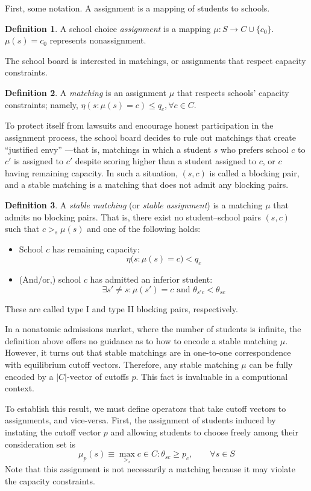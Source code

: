 \documentclass[12pt]{article}
\numberwithin{equation}{subsection}
\theoremstyle{definition}
\newtheorem{definition}{Definition}
\begin{document}
First, some notation. A assignment is a mapping of students to schools.
\begin{definition}
A school choice \emph{assignment} is a mapping $\mu: S \to C \cup \{c_0\}$. $\mu(s) = c_0$ represents nonassignment.
\end{definition}
The school board is interested in matchings, or assignments that respect capacity constraints. 
\begin{definition}
A \emph{matching} is an assignment $\mu$ that respects schools' capacity constraints; namely, $\eta (s: \mu(s) = c) \leq q_c, \forall c \in C$. 
\end{definition}
To protect itself from lawsuits and encourage honest participation in the assignment process, the school board decides to rule out matchings that create ``justified envy'' \parencite[][7]{expandingchoice}---that is, matchings in which a student $s$ who prefers school $c$ to $c'$ is assigned to $c'$ despite scoring higher than a student assigned to $c$, or $c$ having remaining capacity. In such a situation, $(s, c)$ is called a blocking pair, and a stable matching is a matching that does not admit any blocking pairs.
\begin{definition}
A \emph{stable matching} (or \emph{stable assignment}) is a matching $\mu$ that admits no blocking pairs. That is, there exist no student--school pairs $(s, c)$ such that $c >_s \mu(s)$ and one of the following holds:
\begin{itemize}
\item School $c$ has remaining capacity:
\[\eta\bigl(s: \mu(s) = c \bigr) < q_c\]
\item (And/or,) school $c$ has admitted an inferior student:
\[\exists s' \neq s: \mu(s') = c \text{ and } \theta_{s'c} < \theta_{sc}\] 
\end{itemize}
These are called type I and type II blocking pairs, respectively.
\end{definition}

In a nonatomic admissions market, where the number of students is infinite, the definition above offers no guidance as to how to encode a stable matching $\mu$. However, it turns out that stable matchings are in one-to-one correspondence with equilibrium cutoff vectors. Therefore, any stable matching $\mu$ can be fully encoded by a $|C|$-vector of cutoffs $p$. This fact is invaluable in a computional context.

To establish this result, we must define operators that take cutoff vectors to assignments, and vice-versa. First, the assignment of students induced by instating the cutoff vector $p$ and allowing students to choose freely among their consideration set is
\[\mu_p(s) \equiv \max_{>_s} c \in C : \theta_{sc} \geq p_c, \qquad \forall s \in S\] 
Note that this assignment is not necessarily a matching because it may violate the capacity constraints. 
\end{document}
